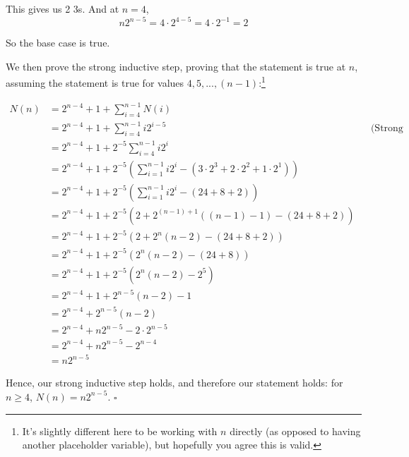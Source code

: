 This gives us 2 3s. And at $n = 4$,
\begin{equation*}
n2^{n-5} = 4 \cdot 2^{4-5} = 4 \cdot 2^{-1} = 2
\end{equation*}

So the base case is true.

We then prove the strong inductive step, proving that the statement is true at $n$, assuming the statement is true for values $4, 5, ..., (n-1)$:\footnote{It's slightly different here to be working with $n$ directly (as opposed to having another placeholder variable), but hopefully you agree this is valid.}

\begin{align*}
N(n) &= 2^{n-4} + 1 + \sum_{i=4}^{n-1} N(i) \\
&= 2^{n-4} + 1 + \sum_{i=4}^{n-1} i2^{i-5} && \text{(Strong inductive assumption)} \\
&= 2^{n-4} + 1 + 2^{-5} \sum_{i=4}^{n-1} i2^{i} \\
&= 2^{n-4} + 1 + 2^{-5} \left(\sum_{i=1}^{n-1} i2^{i} - \left( 3 \cdot 2^3 + 2 \cdot 2^2 + 1 \cdot 2^1 \right) \right) \\
&= 2^{n-4} + 1 + 2^{-5} \left(\sum_{i=1}^{n-1} i2^{i} - (24 + 8 + 2) \right) \\
&= 2^{n-4} + 1 + 2^{-5} \left(2 + 2^{(n-1)+1}((n-1)-1) - (24 + 8 + 2) \right) \\
&= 2^{n-4} + 1 + 2^{-5} \left(2 + 2^{n}(n-2) - (24 + 8 + 2) \right) \\
&= 2^{n-4} + 1 + 2^{-5} \left(2^{n}(n-2) - (24 + 8) \right) \\
&= 2^{n-4} + 1 + 2^{-5} \left(2^{n}(n-2) - 2^5 \right) \\
&= 2^{n-4} + 1 + 2^{n-5}(n-2) - 1 \\
&= 2^{n-4} + 2^{n-5}(n-2) \\
&= 2^{n-4} + n2^{n-5} - 2 \cdot 2^{n-5} \\
&= 2^{n-4} + n2^{n-5} - 2^{n-4} \\
&= n2^{n-5}
\end{align*}

Hence, our strong inductive step holds, and therefore our statement holds: for $n \geq 4$, $N(n) = n2^{n-5}$. $\square$


